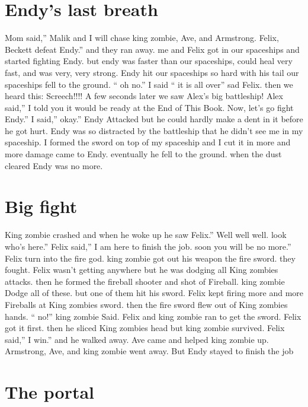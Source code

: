 \documentclass[12pt,oneside]{krantz}
\begin{document}
\hypertarget{endys-last-breath}{%
\chapter{Endy's last breath}\label{endys-last-breath}}

Mom said,'' Malik and I will chase king zombie, Ave, and Armstrong.
Felix, Beckett defeat Endy.'' and they ran away. me and Felix got in our
spaceships and started fighting Endy. but endy was faster than our
spaceships, could heal very fast, and was very, very strong. Endy hit
our spaceships so hard with his tail our spaceships fell to the ground.
`` oh no.'' I said `` it is all over'' sad Felix. then we heard this:
Screech!!!! A few seconds later we saw Alex's big battleship! Alex
said,'' I told you it would be ready at the End of This Book. Now, let's
go fight Endy.'' I said,'' okay.'' Endy Attacked but he could hardly
make a dent in it before he got hurt. Endy was so distracted by the
battleship that he didn't see me in my spaceship. I formed the sword on
top of my spaceship and I cut it in more and more damage came to Endy.
eventually he fell to the ground. when the dust cleared Endy was no
more.

\hypertarget{big-fight}{%
\chapter{Big fight}\label{big-fight}}

King zombie crashed and when he woke up he saw Felix.'' Well well well.
look who's here.'' Felix said,'' I am here to finish the job. soon you
will be no more.'' Felix turn into the fire god. king zombie got out his
weapon the fire sword. they fought. Felix wasn't getting anywhere but he
was dodging all King zombies attacks. then he formed the fireball
shooter and shot of Fireball. king zombie Dodge all of these. but one of
them hit his sword. Felix kept firing more and more Fireballs at King
zombies sword. then the fire sword flew out of King zombies hands. ``
no!'' king zombie Said. Felix and king zombie ran to get the sword.
Felix got it first. then he sliced King zombies head but king zombie
survived. Felix said,'' I win.'' and he walked away. Ave came and helped
king zombie up. Armstrong, Ave, and king zombie went away. But Endy
stayed to finish the job

\hypertarget{the-portal}{%
\chapter{The portal}\label{the-portal}}
\end{document}

